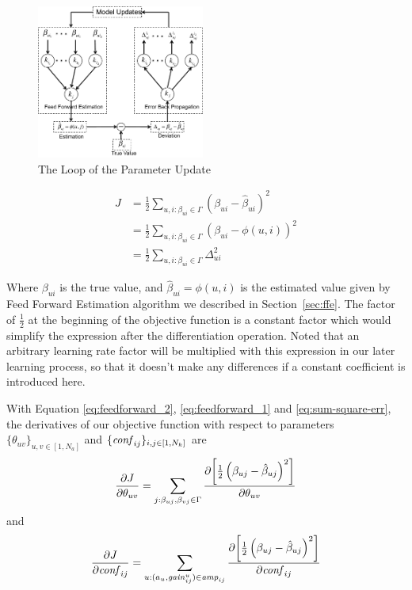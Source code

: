 \begin{figure}[!ht]
  \centering
  \includegraphics[width=0.49\textwidth]{figures/trainer_train_entry.pdf}
  \caption{The Loop of the Parameter Update}
  \label{fig:trainer-train-entry}
\end{figure}

\begin{equation}
  \label{eq:sum-square-err}
  \begin{aligned}
    J &= \frac{1}{2} \sum_{u,i:\beta_{ui}\in\Gamma} \left(\beta_{ui}-\hat{\beta}_{ui}\right)^2 \\
    &= \frac{1}{2} \sum_{u,i:\beta_{ui}\in\Gamma} \left(\beta_{ui}-\phi(u,i)\right)^2 \\
    &= \frac{1}{2} \sum_{u,i:\beta_{ui}\in\Gamma} \Delta^2_{ui}
  \end{aligned}
\end{equation}

Where $\beta_{ui}$ is the true value, and $\hat{\beta}_{ui}=\phi(u,i)$
is the estimated value given by Feed Forward Estimation algorithm we
described in Section~\ref{sec:ffe}. The factor of $\frac{1}{2}$ at the
beginning of the objective function is a constant factor which would
simplify the expression after the differentiation operation. Noted
that an arbitrary learning rate factor will be multiplied with this
expression in our later learning process, so that it doesn't make any
differences if a constant coefficient is introduced here.

With Equation \ref{eq:feedforward_2}, \ref{eq:feedforward_1} and
\ref{eq:sum-square-err}, the derivatives of our objective function
with respect to parameters $\{\theta_{uv}\}_{u,v\in[1,N_a]}$ and
$\{\mathit{conf}_{ij}\}_{i,j\in[1,N_k]}$ are
\[
\frac{\partial {J}}{\partial {\theta_{uv}}} = \sum_{j:\beta_{uj},\beta_{vj}\in\Gamma} \frac{\partial {\left[\frac{1}{2}\left(\beta_{uj}-\hat{\beta}_{uj}\right)^2\right]}}{\partial {\theta_{uv}}}
\]
and
\[
\frac{\partial {J}}{\partial {\mathit{conf}_{ij}}} = \sum_{u:(a_u,\mathit{gain}^{u}_{ij})\in\mathit{amp}_{ij}} \frac{\partial {\left[\frac{1}{2}\left(\beta_{uj}-\hat{\beta}_{uj}\right)^2\right]}}{\partial {\mathit{conf}_{ij}}}
\]

